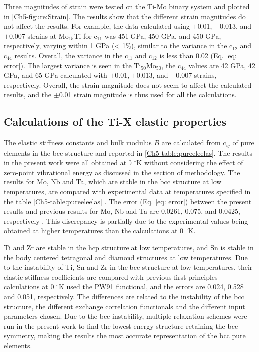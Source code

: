 Three magnitudes of strain were tested on the Ti-Mo binary system and plotted in \ref{Ch5-figure:Strain}. The results show that the different strain magnitudes do not affect the results. For example, the data calculated using $\pm$0.01, $\pm$0.013, and $\pm$0.007 strains at Mo$_{15}$Ti for c$_{11}$ was 451 GPa, 450 GPa, and 450 GPa, respectively, varying within 1 GPa (< 1$\%$), similar to the variance in the c$_{12}$ and c$_{44}$ results. Overall, the variance in the c$_{11}$ and c$_{12}$ is less than 0.02 (Eq. \ref{eq: error}). The largest variance is seen in the Ti$_{50}$Mo$_{50}$, the c$_{44}$ values are 42 GPa, 42 GPa, and 65 GPa calculated with $\pm$0.01, $\pm$0.013, and $\pm$0.007 strains, respectively. Overall, the strain magnitude does not seem to affect the calculated results, and the $\pm$0.01 strain magnitude is thus used for all the calculations.

\subsection{Calculations of the Ti-X elastic properties}

The elastic stiffness constants and bulk modulus $B$ are calculated from c$_{ij}$ of pure elements in the bcc structure and reported in \ref{Ch5-table:pureeleelas}. The results in the present work were all obtained at 0 $^\circ$K without considering the effect of zero-point vibrational energy as discussed in the section of methodology. The results for Mo, Nb and Ta, which are stable in the bcc structure at low temperatures, are compared with experimental data at temperatures specified in the table \ref{Ch5-table:pureeleelas} \cite{Dickinson1967a,Bolef1961}. The error (Eq. \ref{eq: error}) between the present results and previous results for Mo, Nb and Ta are 0.0261, 0.075, and 0.0425, respectively \cite{Simmons1971b,Dickinson1967a,Bolef1961}. This discrepancy is partially due to the experimental values being obtained at higher temperatures than the calculations at 0 $^\circ$K. 

Ti and Zr are stable in the hcp structure at low temperatures, and Sn is stable in the body centered tetragonal and diamond structures at low temperatures. Due to the instability of Ti, Sn and Zr in the bcc structure at low temperatures, their elastic stiffness coefficients are compared with previous first-principles calculations at 0 $^\circ$K \cite{Shang2010b} used the PW91 functional, and the errors are 0.024, 0.528 and 0.051, respectively. The differences are related to the instability of the bcc structure, the different exchange correlation functionals and the different input parameters chosen. Due to the bcc instability, multiple relaxation schemes were run in the present work to find the lowest energy structure retaining the bcc symmetry, making the results the most accurate representation of the bcc pure elements. 
 
